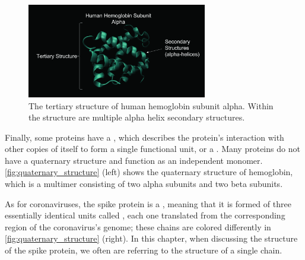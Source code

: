 \begin{figure}[h]
	\centering
	\mySfFamily
	\includegraphics[width = 0.7\textwidth]{../images_CMYK/hemoglobin_tertiary_structure}
	\caption{The tertiary structure of human hemoglobin subunit alpha. Within the structure are multiple alpha helix secondary structures.}
	\label{fig:hemoglobin_tertiary_structure}
\end{figure}

Finally, some proteins have a , which describes the protein’s interaction with other copies of itself to form a single functional unit, or a . Many proteins do not have a quaternary structure and function as an independent monomer. \autoref{fig:quaternary_structure} (left) shows the quaternary structure of hemoglobin, which is a multimer consisting of two alpha subunits and two beta subunits.

As for coronaviruses, the spike protein is a , meaning that it is formed of three essentially identical units called , each one translated from the corresponding region of the coronavirus's genome; these chains are colored differently in \autoref{fig:quaternary_structure} (right). In this chapter, when discussing the structure of the spike protein, we often are referring to the structure of a single chain.\\

